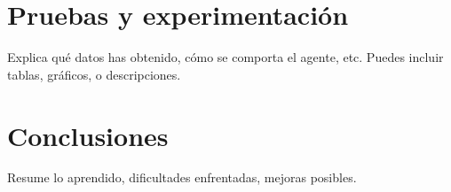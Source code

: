 \documentclass[conference]{IEEEtran}
\begin{document}
\section{Pruebas y experimentación}
Explica qué datos has obtenido, cómo se comporta el agente, etc. Puedes incluir tablas, gráficos, o descripciones.

\section{Conclusiones}
Resume lo aprendido, dificultades enfrentadas, mejoras posibles.




\end{document}
